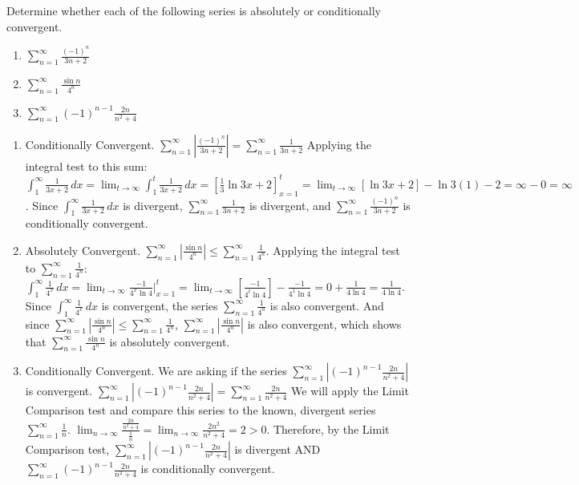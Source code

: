 \begin{Exercise}[label = absconv2]
Determine whether each of the following series is absolutely or conditionally 
convergent. 
\begin{enumerate}
\item $\sum_{n=1}^\infty \frac{(-1)^n}{3n + 2}$
\item $\sum_{n=1}^\infty \frac{\sin{n}}{4^n}$
\item $\sum_{n=1}^\infty (-1)^{n-1} \frac{2n}{n^2 + 4}$ 
\end{enumerate}
\vspace{50mm}
\end{Exercise}

\begin{Answer}[ref = absconv2]
\begin{enumerate}
\item Conditionally Convergent. $\sum_{n=1}^\infty \left| \frac{(-1)^n}{3n+2} 
\right| = \sum_{n=1}^\infty \frac{1}{3n + 2}$ Applying the integral test to 
this sum: $\int_1^\infty \frac{1}{3x+2}\,dx = \lim_{t \to \infty} \int_1^t 
\frac{1}{3x+2}\,dx = \left[ \frac{1}{3} \ln{3x + 2} \right]_{x=1}^t = \lim_{t 
\to \infty} \left[ \ln{3x + 2} \right] - \ln{3(1) - 2} = \infty - 0 = \infty$. 
Since $\int_1^\infty \frac{1}{3x + 2}\,dx$ is divergent, $\sum_{n=1}^\infty 
\frac{1}{3n + 2}$ is divergent, and $\sum_{n=1}^\infty \frac{(-1)^n}{3n + 2}$ 
is conditionally convergent.
\item Absolutely Convergent. $\sum_{n=1}^\infty \left| \frac{\sin{n}}{4^n} 
\right| \leq \sum_{n=1}^\infty \frac{1}{4^n}$. Applying the integral test to 
$\sum_{n=1}^\infty \frac{1}{4^n}$: $\int_1^\infty \frac{1}{4^x}\,dx = \lim_{t 
\to \infty} \frac{-1}{4^x \ln{4}}|_{x=1}^t = \lim_{t \to \infty} \left[ \frac{
-1}{4^t \ln{4}} \right] - \frac{-1}{4^1 \ln{4}} = 0 + \frac{1}{4 \ln{4}} = 
\frac{1}{4 \ln{4}}$. Since $\int_1^\infty \frac{1}{4^x}\,dx$ is convergent, 
the series $\sum_{n=1}^\infty \frac{1}{4^n}$ is also convergent. And since 
$\sum_{n=1}^\infty \left| \frac{\sin{n}}{4^n} \right| \leq \sum_{n=1}^\infty 
\frac{1}{4^n}$, $\sum_{n=1}^\infty \left| \frac{\sin{n}}{4^n} \right|$ is 
also convergent, which shows that $\sum_{n=1}^\infty \frac{\sin{n}}{4^n}$ is 
absolutely convergent. 
\item Conditionally Convergent. We are asking if the series $\sum_{n=1}^\infty 
\left| (-1)^{n-1} \frac{2n}{n^2 + 4} \right|$ is convergent. $\sum_{n=1}^
\infty \left| (-1)^{n-1} \frac{2n}{n^2 + 4} \right| = \sum_{n=1}^\infty 
\frac{2n}{n^2 + 4}$ We will apply the Limit Comparison test and compare this 
series to the known, divergent series $\sum_{n=1}^\infty \frac{1}{n}$. $\lim_{
n \to \infty} \frac{\frac{2n}{n^2 + 4}}{\frac{1}{n}} = \lim_{n \to \infty} 
\frac{2n^2}{n^2 + 4} = 2 >0$. Therefore, by the Limit Comparison test, $\sum_{
n=1}^\infty \left| (-1)^{n-1} \frac{2n}{n^2 + 4} \right|$ is divergent AND 
$\sum_{n=1}^\infty (-1)^{n-1} \frac{2n}{n^2 + 4}$  is conditionally convergent. 
\end{enumerate}
\end{Answer}

